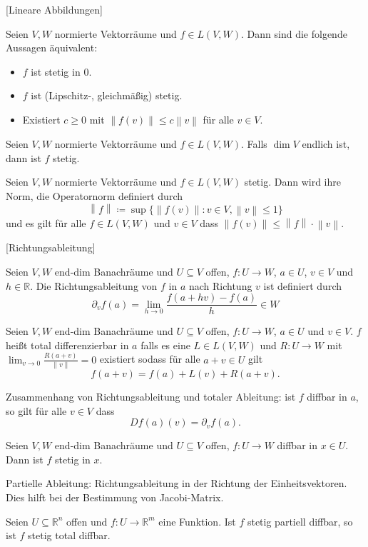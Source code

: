 \documentclass[fleqn,draft,a5paper]{article}
\providecommand{\norm}[1]{\left\lVert#1\right\rVert}
\theoremstyle{remark}
\begin{document}
[Lineare Abbildungen]

Seien \(V, W\) normierte Vektorräume und \(f \in L(V, W)\).  Dann sind
die folgende Aussagen äquivalent:
\begin{itemize}
\item \(f\) ist stetig in \(0\).
\item \(f\) ist (Lipschitz-, gleichmäßig) stetig.
\item Existiert \(c \ge 0\) mit \(\norm{f(v)} \le c \norm{v}\) für alle
  \(v \in V\).
\end{itemize}

Seien \(V, W\) normierte Vektorräume und \(f \in L(V, W)\).  Falls
\(\dim V\) endlich ist, dann ist \(f\) stetig.

Seien \(V, W\) normierte Vektorräume und \(f \in L(V, W)\) stetig.
Dann wird ihre Norm, die Operatornorm definiert durch
\[\norm{f} \coloneq \sup \{\norm{f(v)}\colon v \in V, \norm{v} \le 1\}\]
und es gilt für alle \(f \in L(V, W)\) und \(v \in V\) dass \(\norm{f(v)}
\le \norm{f} \cdot \norm{v}\).

[Richtungsableitung]

Seien \(V, W\) end-dim Banachräume und \(U \subseteq V\) offen,
\(f\colon U \to W\), \(a \in U\), \(v \in V\) und
\(h \in \mathbb{R}\).  Die Richtungsableitung von \(f\) in \(a\) nach Richtung
\(v\) ist definiert durch
\[\partial_{v}f(a) = \lim_{h\to0}\frac{f(a+hv) - f(a)}{h} \in W\]

Seien \(V, W\) end-dim Banachräume und \(U \subseteq V\) offen,
\(f\colon U \to W\), \(a \in U\) und \(v \in V\).  \(f\) heißt total
differenzierbar in \(a\) falls es eine \(L \in L(V, W)\) und
\(R \colon U \to W\) mit \(\lim_{v\to0}\frac{R(a+v)}{\norm{v}}=0\) existiert
sodass für alle \(a+v \in U\) gilt
\[f(a+v) = f(a) + L(v) + R(a+v).\]

Zusammenhang von Richtungsableitung und totaler Ableitung:  ist
\(f\) diffbar in \(a\), so gilt für alle \(v \in V\) dass
\[Df(a)(v)=\partial_{v}f(a).\]

Seien \(V, W\) end-dim Banachräume und \(U \subseteq V\) offen, \(f\colon U \to W\)
diffbar in \(x \in U\).  Dann ist \(f\) stetig in \(x\).

Partielle Ableitung: Richtungsableitung in der Richtung der
Einheitsvektoren.  Dies hilft bei der Bestimmung von
Jacobi-Matrix.

Seien \(U \subseteq \mathbb{R}^{n}\) offen und \(f\colon U \to \mathbb{R}^{m}\) eine Funktion.  Ist
\(f\) stetig partiell diffbar, so ist \(f\) stetig total diffbar.
\end{document}
